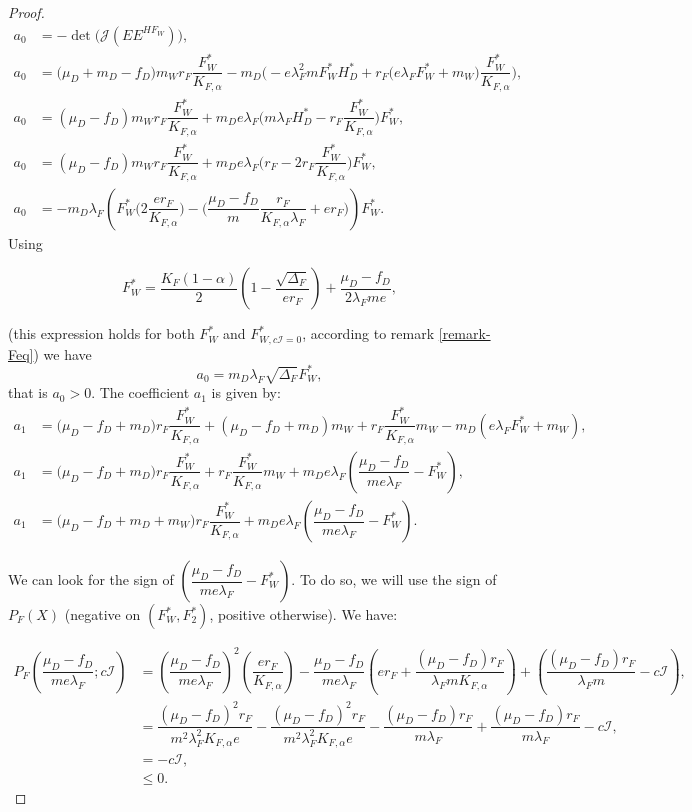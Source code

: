 \documentclass{article}
\newcommand{\lfw}{\lambda_{F}}
\newcommand{\lfw}{\lambda_{F}}
\begin{document}
\begin{proof}
\begin{align*}
a_0 &= -\det\Big(\mathcal{J}(EE^{H F_W})\Big), \\
a_0 &= \Big(\mu_D + m_D -f_D \Big) m_W r_F \dfrac{F^*_W}{K_{F, \alpha}} - m_D\Big(-e\lfw ^2 m F_W^* H_D^* + r_F \big(e \lfw F^*_W + m_W \big) \dfrac{F^*_W}{K_{F, \alpha}} \Big), \\
a_0 &= (\mu_D-f_D) m_W r_F \dfrac{F^*_W}{K_{F, \alpha}} + m_D e \lfw \Big( m \lfw H_D^* - r_F \dfrac{F^*_W}{K_{F, \alpha}} \Big) F^*_W, \\
a_0 &= (\mu_D-f_D) m_W r_F \dfrac{F^*_W}{K_{F, \alpha}} + m_D e \lfw \Big( r_F - 2 r_F \dfrac{F^*_W}{K_{F, \alpha}} \Big) F^*_W, \\
a_0 &= - m_D \lfw \left( F_W^* \Big(2 \dfrac{e r_F}{K_{F, \alpha}} \Big) - \Big(\dfrac{\mu_D - f_D}{m} \dfrac{r_F}{K_{F, \alpha} \lfw} + er_F \Big) \right) F_W^*.
\end{align*}
Using 

\begin{equation*}
F_W^* = \dfrac{K_F(1-\alpha)}{2}\left(1 - \dfrac{\sqrt{\Delta_F}}{er_F}\right) + \dfrac{\mu_D - f_D}{2\lfw m e},
\end{equation*}

(this expression holds for both $F_W^*$ and $F^*_{W, c\mathcal{I} = 0}$, according to remark \ref{remark-Feq}) we have 
\begin{equation*}
a_0 = m_D \lfw \sqrt{\Delta_F}  F^*_{W},
\end{equation*}
that is $a_0>0$. The coefficient $a_1$ is given by:
\begin{align*}
a_1 &= \big( \mu_D  -f_D + m_D) r_F \dfrac{F^*_W}{K_{F, \alpha}} + (\mu_D -f_D + m_D) m_W + r_F \dfrac{F_W^*}{K_{F, \alpha}} m_W - m_D (e\lfw F^*_W + m_W), \\
a_1 &= \big( \mu_D -f_D + m_D) r_F \dfrac{F^*_W}{K_{F, \alpha}}  + r_F \dfrac{F_W^*}{K_{F, \alpha}} m_W + m_D e\lfw   \left(\dfrac{\mu_D - f_D}{m e\lfw} - F^*_W \right),  \\
a_1 &= \big( \mu_D -f_D + m_D + m_W) r_F \dfrac{F^*_W}{K_{F, \alpha}}   + m_D e\lfw   \left(\dfrac{\mu_D - f_D}{m e\lfw} - F^*_W \right).
\end{align*}

We can look for the sign of $\left(\dfrac{\mu_D -f_D}{m e\lfw} - F^*_{W}\right)$. To do so, we will use the sign of $P_F(X)$ (negative on $(F^*_W, F^*_2)$, positive otherwise). We have:

\begin{align*}
P_F \left(\dfrac{\mu_D-f_D}{m e\lfw}; c\mathcal{I}\right) &= \left(\dfrac{\mu_D-f_D}{m e\lfw} \right)^2 \left(\dfrac{er_F}{K_{F, \alpha}} \right) - \dfrac{\mu_D-f_D}{m e\lfw} \left(er_F + \dfrac{(\mu_D -f_D) r_F}{\lfw m K_{F, \alpha}} \right) + \left(\dfrac{(\mu_D-f_D) r_F}{\lfw m} - c\mathcal{I}\right), \\
&= \dfrac{(\mu_D-f_D)^2 r_F}{m^2 \lfw^2 K_{F, \alpha} e} - \dfrac{(\mu_D-f_D)^2 r_F}{m^2 \lfw^2 K_{F, \alpha} e} - \dfrac{(\mu_D-f_D) r_F}{m \lfw} + \dfrac{(\mu_D-f_D) r_F}{m \lfw} - c\mathcal{I}, \\
&= - c\mathcal{I},\\
& \leq 0.
\end{align*}


\end{proof}
\end{document}
